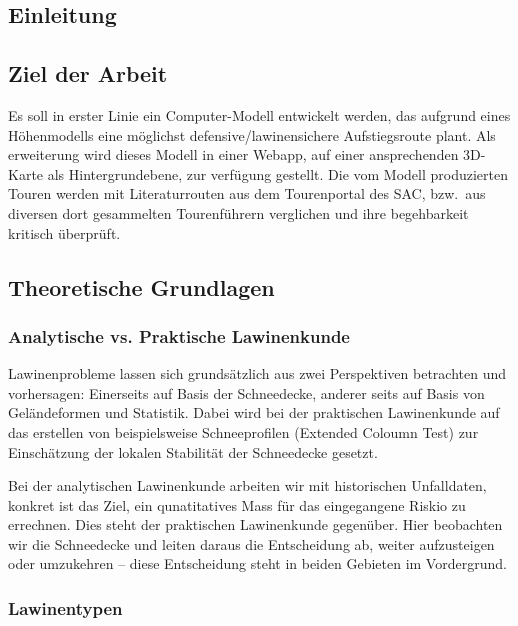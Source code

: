 \begin{multicols}{2}

\section{Einleitung}

\subsection{Ziel der Arbeit}

Es soll in erster Linie ein Computer-Modell entwickelt werden, das aufgrund eines Höhenmodells eine möglichst defensive/lawinensichere Aufstiegsroute plant. Als erweiterung wird dieses Modell in einer Webapp, auf einer ansprechenden 3D-Karte als Hintergrundebene, zur verfügung gestellt. Die vom Modell produzierten Touren werden mit Literaturrouten aus dem Tourenportal des SAC, bzw.\ aus diversen dort gesammelten Tourenführern verglichen und ihre begehbarkeit kritisch überprüft.

\subsection{Theoretische Grundlagen}
\subsubsection{Analytische vs. Praktische Lawinenkunde}
Lawinenprobleme lassen sich grundsätzlich aus zwei Perspektiven betrachten und vorhersagen: Einerseits auf Basis der Schneedecke, anderer seits auf Basis von Geländeformen und Statistik.
Dabei wird bei der praktischen Lawinenkunde auf das erstellen von beispielsweise Schneeprofilen (Extended Coloumn Test) zur Einschätzung der lokalen Stabilität der Schneedecke gesetzt.

Bei der analytischen Lawinenkunde arbeiten wir mit historischen Unfalldaten, konkret ist das Ziel, ein qunatitatives Mass für das eingegangene Riskio zu errechnen.
Dies steht der praktischen Lawinenkunde gegenüber. Hier beobachten wir die Schneedecke und leiten daraus die Entscheidung ab, weiter aufzusteigen oder umzukehren – diese Entscheidung steht in beiden Gebieten im Vordergrund.

\subsubsection{Lawinentypen}


\end{multicols}
